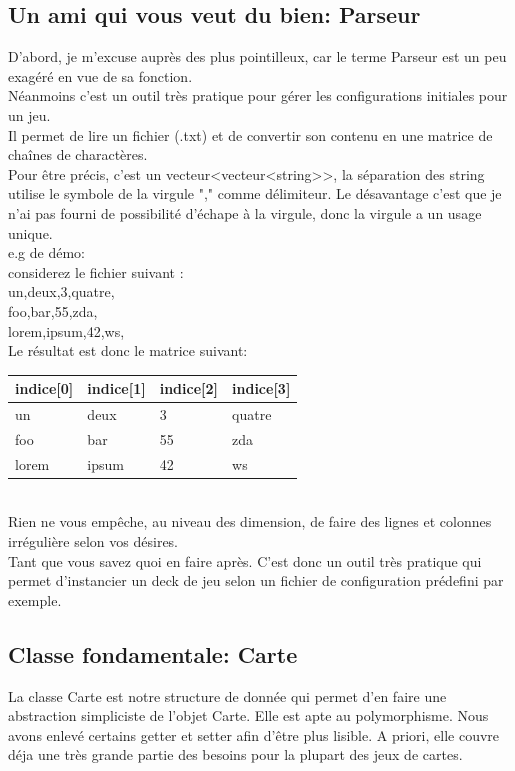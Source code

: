 \documentclass[12pt, letterpaper]{article}
\begin{document}
\subsection{Un ami qui vous veut du bien: Parseur}
D'abord, je m'excuse auprès des plus pointilleux, car le terme Parseur est un peu exagéré en vue de sa fonction.\\
Néanmoins c'est un outil très pratique pour gérer les configurations initiales pour un jeu.\\
Il permet de lire un fichier (.txt) et de convertir son contenu en une matrice de chaînes de charactères.\\
Pour être précis, c'est un vecteur<vecteur<string>>, la séparation des string utilise le symbole de la virgule "," comme délimiteur.
Le désavantage c'est que je n'ai pas fourni de possibilité d'échape à la virgule, donc
la virgule a un usage unique.\\
e.g de démo: \\
considerez le fichier suivant :\\
un,deux,3,quatre,\\
foo,bar,55,zda,\\
lorem,ipsum,42,ws,\\

Le résultat est donc le matrice suivant:\\
\begin{tabular}{l|l|l|l}
  indice[0]  & indice[1] & indice[2] & indice[3]\\
  \hline  
  un & deux & 3 & quatre\\
  \hline
  foo & bar & 55 & zda\\
  \hline
  lorem & ipsum & 42 & ws\\
\end{tabular}
\\
Rien ne vous empêche, au niveau des dimension, de faire des lignes et colonnes irrégulière selon vos désires.\\
Tant que vous savez quoi en faire après.
C'est donc un outil très pratique qui permet d'instancier un deck de jeu selon un fichier de configuration prédefini par exemple.


\subsection{Classe fondamentale: Carte}
La classe Carte est notre structure de donnée qui permet d'en faire une abstraction simpliciste de l'objet Carte.
Elle est apte au polymorphisme. Nous avons enlevé certains getter et setter afin d'être plus lisible. 
A priori, elle couvre déja une très grande partie des besoins pour la plupart des jeux de cartes.\\
\end{document}
